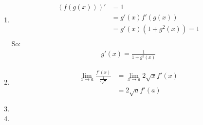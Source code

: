 \documentclass{article}
\begin{document}
\begin{enumerate}
		\item
		\begin{align*}
			(f(g(x)))' &= 1 \\
			&= g'(x)f'(g(x)) \\
			&= g'(x)(1 + g^2(x)) = 1 \\
		\end{align*}
		So:
		\begin{align*}
			g'(x) = \frac{1}{1 + g^2(x)}
		\end{align*}
			
		\item 
		\begin{align*}
			\lim_{x \rightarrow a} \frac{f'(x)}{\frac{1}{2\sqrt{x}}} &= \lim_{x \rightarrow a} 2\sqrt{x}f'(x) \\
			&= 2\sqrt{a}f'(a)
		\end{align*}
	
		\item 
		
		\item 				
	\end{enumerate}
\end{document}
